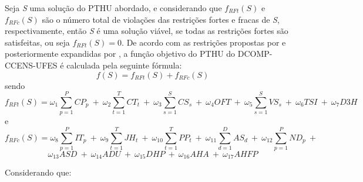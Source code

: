Seja \textit{S} uma solução do PTHU abordado, e considerando que \(f_{RFt}(S)\) e \(f_{RFc}(S)\) são o número total de violações das restrições fortes e fracas de \textit{S}, respectivamente, então \textit{S} é uma solução viável, se todas as restrições fortes são satisfeitas, ou seja \(f_{RFt}(S) = 0\). De acordo com as restrições propostas por  e posteriormente expandidas por , a função objetivo do PTHU do DCOMP-CCENS-UFES é calculada pela seguinte fórmula:
    \[f(S) = f_{RFt}(S) + f_{RFc}(S)\]
sendo
    \[f_{RFt}(S) = \omega_1\sum_{p=1}^{P}CP_p\ +\ \omega_2\sum_{t=1}^{T}CT_t\ +\ \omega_3\sum_{s=1}^{S}CS_s\ +\ \omega_4OFT\ +\ \omega_5\sum_{s=1}^{S}VS_s\ +\ \omega_6TSI\ +\ \omega_7D3H\]
e
    \[f_{RFc}(S) = \omega_8\sum_{p=1}^{P}IT_p\ +\ \omega_9\sum_{t=1}^{T}JH_t\ +\ \omega_{10}\sum_{t=1}^{T}PP_t\ +\ \omega_{11}\sum_{d=1}^{D}AS_d\ +\ \omega_{12}\sum_{p=1}^{P}ND_p\ +\] 
    \[\omega_{13}ASD\ +\ \omega_{14}ADU\ +\ \omega_{15}DHP\ +\ \omega_{16}AHA\ +\ \omega_{17}AHFP\]

Considerando que:

